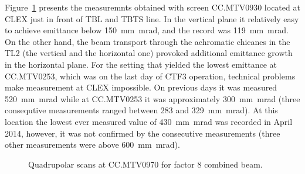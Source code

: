 Figure~\ref{fig:record_low_factor8_30} presents the measuremnts obtained with screen CC.MTV0930 
located at CLEX just in front of TBL and TBTS line. 
In the vertical plane it relatively easy to achieve emittance below 150~mm~mrad, and the record was 119~mm~mrad.
On the other hand, the beam transport through the achromatic chicanes in the TL2 (the vertical and the horizontal one)
provoked additional emittance growth in the horizontal plane. 
For the setting that yielded the lowest emittance at CC.MTV0253, which was on the last day of CTF3 operation,
technical problems make measurement at CLEX impossible. 
On previous days it was measured 520~mm~mrad while at CC.MTV0253 it was approximately 300~mm~mrad 
(three consequtive measurements ranged between 283 and 329~mm~mrad).
At this location the lowest ever measured value of 430~mm~mrad was recorded in April 2014, however, 
it was not confirmed by the consecutive measurements (three other measurements were above 600~mm~mrad).




\begin{figure}[!h]
\begin{center}


\end{center}
\caption{Quadrupolar scans at CC.MTV0970 for factor 8 combined beam.}
\label{fig:record_low_factor8_30}
\end{figure}



